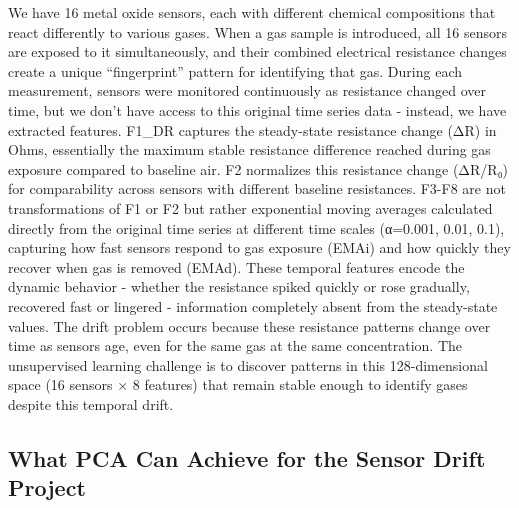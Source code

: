 \documentclass[
  letterpaper,
  DIV=11,
  numbers=noendperiod]{scrartcl}
\begin{document}
We have 16 metal oxide sensors, each with different chemical
compositions that react differently to various gases. When a gas sample
is introduced, all 16 sensors are exposed to it simultaneously, and
their combined electrical resistance changes create a unique
``fingerprint'' pattern for identifying that gas. During each
measurement, sensors were monitored continuously as resistance changed
over time, but we don't have access to this original time series data -
instead, we have extracted features. F1\_DR captures the steady-state
resistance change (ΔR) in Ohms, essentially the maximum stable
resistance difference reached during gas exposure compared to baseline
air. F2 normalizes this resistance change (ΔR/R₀) for comparability
across sensors with different baseline resistances. F3-F8 are not
transformations of F1 or F2 but rather exponential moving averages
calculated directly from the original time series at different time
scales (α=0.001, 0.01, 0.1), capturing how fast sensors respond to gas
exposure (EMAi) and how quickly they recover when gas is removed (EMAd).
These temporal features encode the dynamic behavior - whether the
resistance spiked quickly or rose gradually, recovered fast or lingered
- information completely absent from the steady-state values. The drift
problem occurs because these resistance patterns change over time as
sensors age, even for the same gas at the same concentration. The
unsupervised learning challenge is to discover patterns in this
128-dimensional space (16 sensors × 8 features) that remain stable
enough to identify gases despite this temporal
drift.\hspace{0pt}\hspace{0pt}\hspace{0pt}\hspace{0pt}\hspace{0pt}\hspace{0pt}\hspace{0pt}\hspace{0pt}\hspace{0pt}\hspace{0pt}\hspace{0pt}\hspace{0pt}\hspace{0pt}\hspace{0pt}\hspace{0pt}\hspace{0pt}

\subsection{What PCA Can Achieve for the Sensor Drift
Project}\label{what-pca-can-achieve-for-the-sensor-drift-project}
\end{document}
